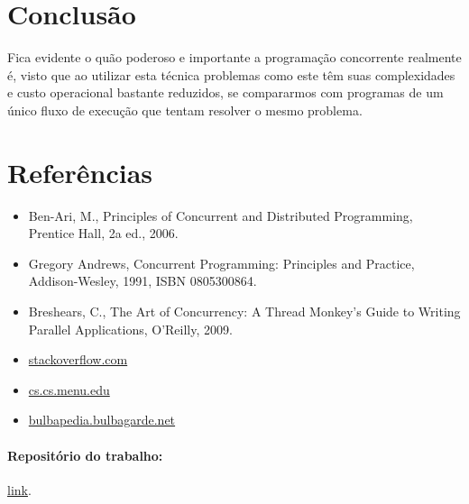 \documentclass{article}
\begin{document}
\section{Conclusão}
Fica evidente o quão poderoso e importante a programação concorrente realmente é, visto que ao utilizar esta técnica problemas como este têm suas complexidades e custo operacional bastante reduzidos, se compararmos com programas de um único fluxo de execução que tentam resolver o mesmo problema.

\section{Referências}
\begin{itemize}
        \item Ben-Ari, M., Principles of Concurrent and Distributed Programming, Prentice Hall, 2a ed., 2006.
        \item Gregory Andrews, Concurrent Programming: Principles and Practice, Addison-Wesley, 1991, ISBN 0805300864.
        \item Breshears, C., The Art of Concurrency: A Thread Monkey’s Guide to Writing Parallel Applications, O’Reilly, 2009.
        \item \href{https://stackoverflow.com/questions/27294954/how-to-use-sem-trywait}{stackoverflow.com}
        \item \href{https://www.cs.cmu.edu/afs/cs/academic/class/15492-f07/www/pthreads.html}{cs.cs.menu.edu}
        \item \href{https://bulbapedia.bulbagarden.net/wiki/Sableye_(Pok%C3%A9mon)}{bulbapedia.bulbagarde.net}
\end{itemize}

\paragraph*{Repositório do trabalho:} \href{https://github.com/GRochaC/A_Caverna_dos_Sableyes/tree/main}{link}.
\end{document}
